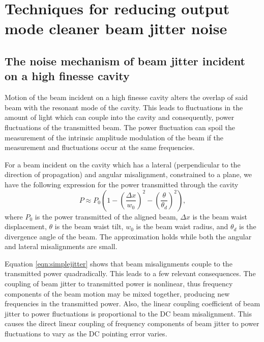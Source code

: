 \chapter{Techniques for reducing output mode cleaner beam jitter noise}

\cite{Kawamura:94}

\section{The noise mechanism of beam jitter incident on a high finesse cavity}

Motion of the beam incident on a high finesse cavity alters the overlap of said beam with the resonant mode of the cavity. %
This leads to fluctuations in the amount of light which can couple into the cavity and consequently, power fluctuations of the transmitted beam. %
The power fluctuation can spoil the measurement of the intrinsic amplitude modulation of the beam if the measurement and fluctuations occur at the same frequencies.

For a beam incident on the cavity which has a lateral (perpendicular to the direction of propagation) and angular misalignment, constrained to a plane, we have the following expression for the power transmitted through the cavity
\begin{equation}
\label{eqn:simplejitter}
P\approx P_0\left(1-\left(\frac{\Delta x}{w_0}\right)^2-\left(\frac{\theta}{\theta_d}\right)^2\right),
\end{equation}
where $P_0$ is the power transmitted of the aligned beam, $\Delta x$ is the beam waist displacement, $\theta$ is the beam waist tilt, $w_0$ is the beam waist radius, and $\theta_d$ is the divergence angle of the beam. %
The approximation holds while both the angular and lateral misalignments are small.

Equation \ref{eqn:simplejitter} shows that beam misalignments couple to the transmitted power quadradically. %
This leads to a few relevant consequences. %
The coupling of beam jitter to transmitted power is nonlinear, thus frequency components of the beam motion may be mixed together, producing new frequencies in the transmitted power. %
Also, the linear coupling coefficient of beam jitter to power fluctuations is proportional to the DC beam misalignment. %
This causes the direct linear coupling of frequency components of beam jitter to power fluctuations to vary as the DC pointing error varies.

